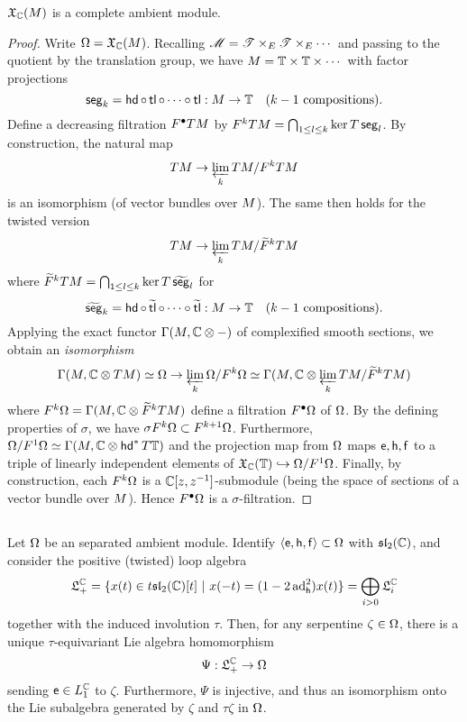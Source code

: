 \begin{lem} $\mathfrak{X}_{{\mathbb{C}}}(M)$ is a complete ambient module.\end{lem}
\begin{proof}
Write $\Omega = \mathfrak{X}_{{\mathbb{C}}}(M)$. Recalling $\mathscr{M} = \mathscr{T}\times_E \mathscr{T}\times_E\cdots$ and passing to
the quotient by the translation group, we have $M = {\mathbb{T}} \times {\mathbb{T}} \times \cdots$ with
factor projections
\[
        \operatorname{\mathsf{seg}}_k = \operatorname{\mathsf{hd}} \circ \operatorname{\mathsf{tl}} \circ\cdots \circ \operatorname{\mathsf{tl}} : M\to{\mathbb{T}}\quad   \textrm{($k-1$ compositions)}.
\]
Define a decreasing filtration $F^\bullet TM$ by $F^k TM = \bigcap_{1 \le l\le k} \ker T\operatorname{\mathsf{seg}}_l$.
By construction, the natural map 
\[
    TM \to \varprojlim_k TM / F^k TM
\]
is an isomorphism (of vector bundles over $M$). The same then holds for
the twisted version 
\[
    TM \to \varprojlim_k TM / \widetilde{F}^k TM
\]
where $\widetilde{F}^k TM = \bigcap_{1 \le l\le k} \ker T\operatorname{\widetilde{\operatorname{\mathsf{seg}}}}_l$ for
\[ 
        \operatorname{\widetilde{\operatorname{\mathsf{seg}}}}_k = \operatorname{\mathsf{hd}} \circ \operatorname{\widetilde{\operatorname{\mathsf{tl}}}} \circ\cdots\circ\operatorname{\widetilde{\operatorname{\mathsf{tl}}}} : M\to{\mathbb{T}}\quad  \textrm{($k-1$ compositions)}.
\]
Applying the exact functor $\Gamma(M,{\mathbb{C}}\otimes-)$ of complexified smooth sections,
we obtain an \emph{isomorphism}
\[
        \Gamma(M,{\mathbb{C}}\otimes TM) \simeq \Omega \to \varprojlim_k \Omega / F^k \Omega \simeq \Gamma(M, {\mathbb{C}}\otimes \varprojlim_k TM/\widetilde{F}^k TM)
\]
where $F^k \Omega = \Gamma(M, {\mathbb{C}}\otimes\widetilde{F}^k TM)$ define a filtration $F^\bullet\Omega$ of $\Omega$. By the
defining properties of $\sigma$, we have $\sigma F^k \Omega \subset F^{k+1} \Omega$. Furthermore,
$\Omega/F^1\Omega \simeq \Gamma(M,{\mathbb{C}}\otimes\operatorname{\mathsf{hd}}^* T{\mathbb{T}})$ and the projection map from $\Omega$
maps $\mathsf{e},\mathsf{h},\mathsf{f}$ to a triple of linearly independent elements of $\mathfrak{X}_{{\mathbb{C}}}({\mathbb{T}}) \hookrightarrow \Omega/F^1\Omega$. 
Finally, by
construction, each $F^k \Omega$ is a ${\mathbb{C}}[z,z^{-1}]$-submodule (being the space of
sections of a vector bundle over $M$). Hence $F^\bullet\Omega$ is a $\sigma$-filtration. 
\end{proof}

\subsection{}
\begin{thm}\label{thm:algebraic}
Let $\Omega$ be an separated ambient module. Identify $\langle\mathsf{e},\mathsf{h},\mathsf{f}\rangle\subset\Omega$
with $\mathfrak{sl}_2({\mathbb{C}})$, and consider the positive (twisted) loop algebra 
\[
        \mathfrak{L}_+^{{\mathbb{C}}} = \{ x(t) \in t \mathfrak{sl}_2({\mathbb{C}})[t]\ |\ x(-t) = (1 - 2 \operatorname{\mathrm{ad}}^2_{\mathsf{h}}) x(t) \} 
        = \bigoplus_{i>0} \mathfrak{L}_i^{{\mathbb{C}}}
 \]
together with the induced involution $\tau$. Then, for any serpentine
$\zeta\in\Omega$, there is a unique $\tau$-equivariant Lie algebra homomorphism
\[
        \Psi : \mathfrak{L}_+^{{\mathbb{C}}} \to \Omega
\]
sending $\mathsf{e} \in L_1^{{\mathbb{C}}}$ to $\zeta$. Furthermore, $\Psi$ is injective, and thus an
isomorphism onto the Lie subalgebra generated by $\zeta$ and $\tau\zeta$ in $\Omega$.
\end{thm}

